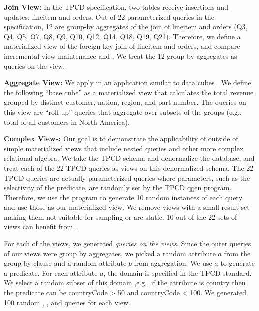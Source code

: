 \textbf{Join View: } In the TPCD specification, two tables receive insertions and updates: \textsf{lineitem} and \textsf{orders}.
Out of 22 parameterized queries in the specification, 12 are group-by aggregates of the join of \textsf{lineitem} and \textsf{orders} (Q3, Q4, Q5, Q7, Q8, Q9, Q10, Q12, Q14, Q18, Q19, Q21).
Therefore, we define a materialized view of the foreign-key join of \textsf{lineitem} and \textsf{orders}, and compare incremental view maintenance and \svc.
We treat the 12 group-by aggregates as queries on the view.

\textbf{Aggregate View: } We apply \svc in an application similar to data cubes \cite{gray1997data}.
We define the following ``base cube'' as a materialized view that calculates the total revenue 
grouped by distinct customer, nation, region, and part number.
The queries on this view are ``roll-up'' queries that aggregate over 
subsets of the groups (e.g., total of all customers in North America).

\textbf{Complex Views:} Our goal is to demonstrate the applicability of \svc outside of simple materialized views that include nested queries and other more complex relational algebra.
We take the TPCD schema and denormalize the database, and treat each of the 22 
TPCD queries as views on this denormalized schema. 
The 22 TPCD queries are actually parameterized queries where parameters, such as the selectivity of the predicate, are randomly set by the TPCD \textsf{qgen} program.
Therefore, we use the program to generate 10 random instances of each query and use those as our materialized view.
We remove views with a small result set making them not suitable for sampling or are static.
10 out of the 22 sets of views can benefit from \svc.


For each of the views, we generated \emph{queries on the views}.
Since the outer queries of our views were group by aggregates, we picked a random attribute $a$ from the group by clause and a random attribute $b$ from aggregation.
We use $a$ to generate a predicate.
For each attribute $a$, the domain is specified in the TPCD standard.
We select a random subset of this domain ,e.g., if the attribute is country then the predicate can be \textsf{countryCode} > 50 and \textsf{countryCode} < 100.
We generated 100 random \sumfunc, \avgfunc, and \countfunc queries for each view.

